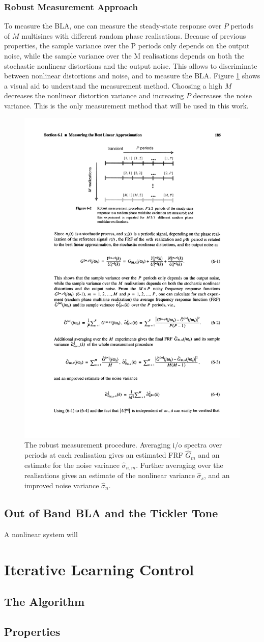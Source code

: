 	\subsubsection{Robust Measurement Approach }

	To measure the BLA, one can measure  the steady-state response over $P$ periods of $M$ multisines with different random phase realisations. Because of previous properties, the sample variance over the P periods only depends on the output noise, while the sample variance over the M realisations depends on both the stochastic nonlinear distortions and the output noise. This allows to discriminate between nonlinear distortions and noise, and to measure the BLA. Figure \ref{fig:robustMt} shows a visual aid to understand the measurement method. Choosing a high $M$ decreases the nonlinear distortion variance and increasing $P$ decreases the noise variance. This is the only measurement method that will be used in this work.

	\begin{figure}[hbtp]
	\centering
		\includegraphics[width=0.5\linewidth]{images/robustMt.pdf}
		\caption{The robust measurement procedure. Averaging i/o spectra over periods at each realisation gives an estimated FRF $\hat{G}_m$ and an estimate for the noise variance $\hat{\sigma}_{n,m}$. Further averaging over the realisations gives an estimate of the nonlinear variance $\hat{\sigma}_s$, and an improved noise variance $\hat{\sigma}_{n}$.}
		\label{fig:robustMt}
	\end{figure}

	\subsection{Out of Band BLA and the Tickler Tone}
	
	A nonlinear system will 

	
\section{Iterative Learning Control}
	\subsection{The Algorithm}
	\subsection{Properties}